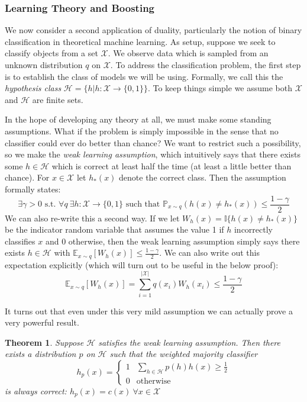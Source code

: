 \documentclass[12pt]{article}
\newcommand*{\abs}[1]{\left\lvert#1\right\rvert}
\newcommand{\E}{\mathbb{E}}
\newcommand{\Prob}{\mathbb{P}}
\newtheorem{thm}{Theorem}
\begin{document}
\subsubsection{Learning Theory and Boosting}
We now consider a second application of duality, particularly the notion of binary classification in theoretical machine learning. As setup, suppose we seek to classify objects from a set
$\mathcal{X}$. We observe data which is sampled from an unknown distribution $q$ on $\mathcal{X}$. To address the classification problem, the first step is to establish the class of 
models we will be using. Formally, we call this the \textit{hypothesis class} $\mathcal{H} = \{h | h: \mathcal{X} \to \{0, 1\}\}$. To keep things simple we assume both $\mathcal{X}$ and 
$\mathcal{H}$ are finite sets. 

In the hope of developing any theory at all, we must make some standing 
assumptions. What if the problem is simply impossible in the sense that no classifier could ever do better than chance? We want to restrict such a possibility, so we make the \textit{weak learning assumption}, 
which intuitively says that there exists some $h \in \mathcal{H}$ which is correct at least half the time (at least a little better than chance). For $x \in \mathcal{X}$ let $h_*(x)$ denote the correct class. Then the 
assumption formally states: 
\[\exists \gamma > 0 \text{ s.t. } \forall q \ \exists h: \mathcal{X} \to \{0, 1\} \text{ such that } \Prob_{x \sim q}\left(h(x) \neq h_*(x)\right) \leq \frac{1 - \gamma}{2}\]
We can also re-write this a second way. If we let $W_{h}(x) = \mathbb{I}\{h(x) \neq h_*(x)\}$ be the indicator random variable that assumes the value 1 if $h$ incorrectly classifies $x$ and $0$ otherwise, then 
the weak learning assumption simply says there exists $h \in \mathcal{H}$ with $\E_{x \sim q} [W_h(x)] \leq \frac{1 - \gamma}{2}$. We can also write out this expectation explicitly (which will turn out to be useful
in the below proof): 
\[\E_{x \sim q} [W_h(x)] = \sum_{i = 1}^{\abs{\mathcal{X}}} q(x_i) W_h(x_i) \leq \frac{1 - \gamma}{2}\] 

It turns out that even under this very mild assumption we can actually prove a very powerful result. 

\begin{thm}
Suppose $\mathcal{H}$ satisfies the weak learning assumption. Then there exists a distribution $p$ on $\mathcal{H}$ such that the weighted majority classifier 
\[h_p(x) = \begin{cases} 
      1 & \sum_{h \in \mathcal{H}} p(h)h(x) \geq \frac{1}{2} \\
      0 & \text{otherwise}
   \end{cases}
\]
is always correct: $h_p(x) = c(x) \ \forall x \in \mathcal{X}$
\end{thm}
\end{document}
